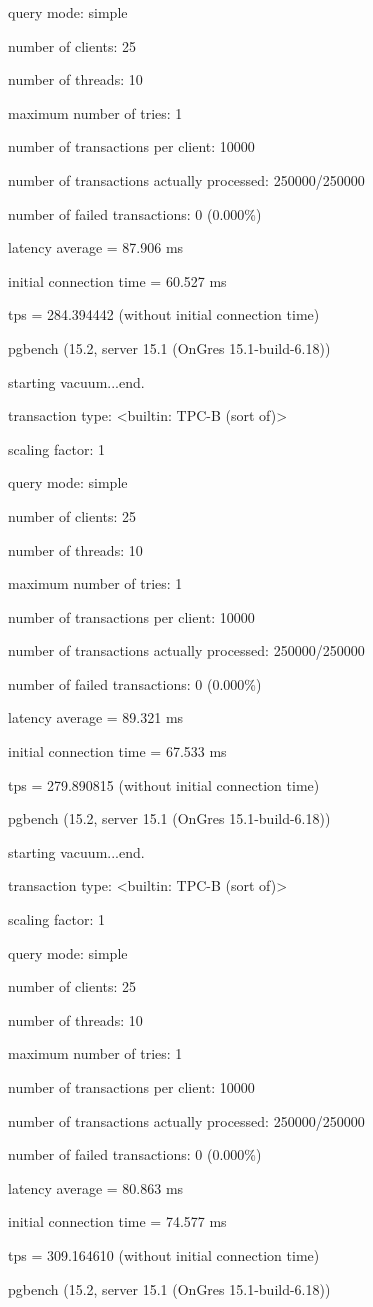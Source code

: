 query mode: simple

number of clients: 25

number of threads: 10

maximum number of tries: 1

number of transactions per client: 10000

number of transactions actually processed: 250000/250000

number of failed transactions: 0 (0.000\%)

latency average = 87.906 ms

initial connection time = 60.527 ms

tps = 284.394442 (without initial connection time)

pgbench (15.2, server 15.1 (OnGres 15.1-build-6.18))

starting vacuum...end.

transaction type: <builtin: TPC-B (sort of)>

scaling factor: 1

query mode: simple

number of clients: 25

number of threads: 10

maximum number of tries: 1

number of transactions per client: 10000

number of transactions actually processed: 250000/250000

number of failed transactions: 0 (0.000\%)

latency average = 89.321 ms

initial connection time = 67.533 ms

tps = 279.890815 (without initial connection time)


pgbench (15.2, server 15.1 (OnGres 15.1-build-6.18))

starting vacuum...end.

transaction type: <builtin: TPC-B (sort of)>

scaling factor: 1

query mode: simple

number of clients: 25

number of threads: 10

maximum number of tries: 1

number of transactions per client: 10000

number of transactions actually processed: 250000/250000

number of failed transactions: 0 (0.000\%)

latency average = 80.863 ms

initial connection time = 74.577 ms

tps = 309.164610 (without initial connection time)

pgbench (15.2, server 15.1 (OnGres 15.1-build-6.18))

